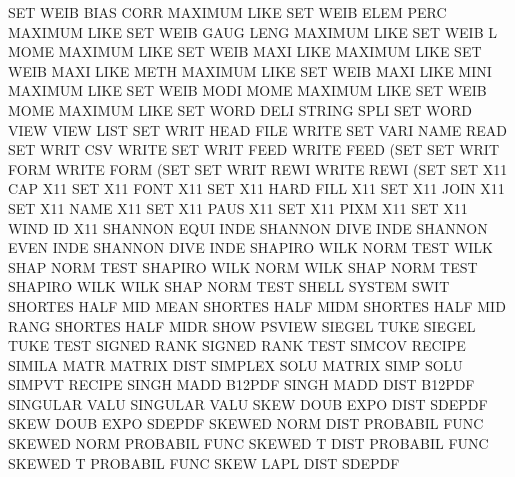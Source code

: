 SET      WEIB BIAS CORR                 MAXIMUM  LIKE
SET      WEIB ELEM PERC                 MAXIMUM  LIKE
SET      WEIB GAUG LENG                 MAXIMUM  LIKE
SET      WEIB L    MOME                 MAXIMUM  LIKE
SET      WEIB MAXI LIKE                 MAXIMUM  LIKE
SET      WEIB MAXI LIKE METH            MAXIMUM  LIKE
SET      WEIB MAXI LIKE MINI            MAXIMUM  LIKE
SET      WEIB MODI MOME                 MAXIMUM  LIKE
SET      WEIB MOME                      MAXIMUM  LIKE
SET      WORD DELI                      STRING   SPLI
SET      WORD VIEW VIEW                 LIST
SET      WRIT HEAD FILE                 WRITE
SET      VARI NAME                      READ
SET      WRIT CSV                       WRITE
SET      WRIT FEED                      WRITE    FEED (SET
SET      WRIT FORM                      WRITE    FORM (SET
SET      WRIT REWI                      WRITE    REWI (SET
SET      X11  CAP                       X11
SET      X11  FONT                      X11
SET      X11  HARD FILL                 X11
SET      X11  JOIN                      X11
SET      X11  NAME                      X11
SET      X11  PAUS                      X11
SET      X11  PIXM                      X11
SET      X11  WIND ID                   X11
SHANNON  EQUI INDE                      SHANNON  DIVE INDE
SHANNON  EVEN INDE                      SHANNON  DIVE INDE
SHAPIRO  WILK NORM TEST                 WILK     SHAP NORM TEST
SHAPIRO  WILK NORM                      WILK     SHAP NORM TEST
SHAPIRO  WILK                           WILK     SHAP NORM TEST
SHELL                                   SYSTEM   SWIT
SHORTES  HALF MID  MEAN                 SHORTES  HALF MIDM
SHORTES  HALF MID  RANG                 SHORTES  HALF MIDR
SHOW                                    PSVIEW
SIEGEL   TUKE                           SIEGEL   TUKE TEST
SIGNED   RANK                           SIGNED   RANK TEST
SIMCOV                                  RECIPE
SIMILA   MATR                           MATRIX   DIST
SIMPLEX  SOLU                           MATRIX   SIMP SOLU
SIMPVT                                  RECIPE
SINGH    MADD                           B12PDF
SINGH    MADD DIST                      B12PDF
SINGULAR VALU                           SINGULAR VALU
SKEW     DOUB EXPO DIST                 SDEPDF
SKEW     DOUB EXPO                      SDEPDF
SKEWED   NORM DIST                      PROBABIL FUNC
SKEWED   NORM                           PROBABIL FUNC
SKEWED   T    DIST                      PROBABIL FUNC
SKEWED   T                              PROBABIL FUNC
SKEW     LAPL DIST                      SDEPDF
